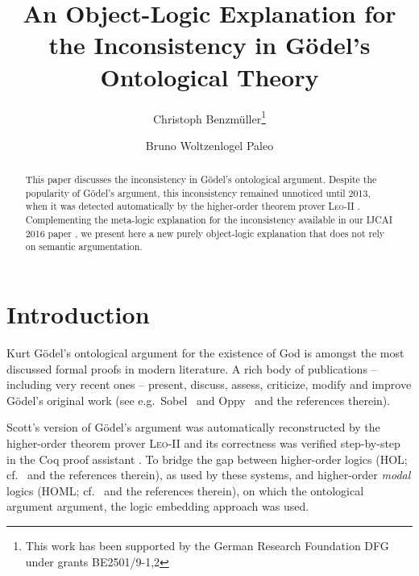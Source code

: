 \documentclass{llncs}
\begin{document}
\title{An Object-Logic Explanation for the Inconsistency in G\"odel's Ontological Theory}
\author{Christoph Benzm\"uller\thanks{This work has been supported by
    the German Research Foundation DFG under grants BE2501/9-1,2} \and Bruno Woltzenlogel Paleo 
}


\maketitle            



\begin{abstract}
  This paper discusses the 
  inconsistency in G\"odel's
  ontological argument. Despite the popularity of G\"odel's argument, this
  inconsistency remained unnoticed until 2013, 
  when it was detected automatically by the 
  higher-order theorem prover \textsc{Leo-II} \cite{ECAI2014}. Complementing the meta-logic explanation for the inconsistency available in our IJCAI 2016 paper \cite{C55}, we present here a new purely object-logic explanation that does not rely on semantic argumentation.
  
\end{abstract}




\section{Introduction}\label{sec:introduction}
Kurt G\"{o}del's ontological
argument for the existence of God \cite{GoedelNotes,ScottNotes} is
amongst the most discussed formal proofs in modern literature. A rich
body of publications -- including very recent ones -- present,
discuss, assess, criticize, modify and improve G\"{o}del's original
work (see e.g.~Sobel~\cite{sobel2004logic} and Oppy~\cite{sep-ontological-arguments} and the
references therein). 

Scott's version of G\"odel's argument was automatically reconstructed by the higher-order theorem prover \textsc{Leo-II} \cite{C40} and its correctness was verified step-by-step in the Coq proof assistant \cite{CSR}. To bridge the gap between higher-order logics (HOL; cf.~\cite{andrewsSEP} and the references
therein), as used by these systems, and higher-order \emph{modal} logics (HOML; cf.~\cite{homl} and the
references therein), on which the ontological argument argument, the logic embedding approach \cite{J23,C40} was used.
\end{document}
